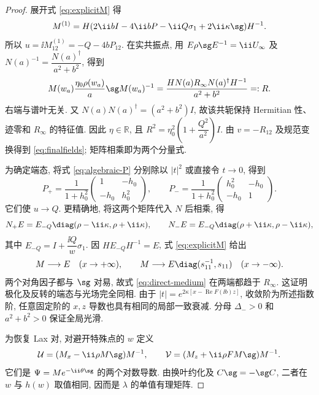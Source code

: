 \begin{proof}
展开式 \eqref{eq:explicitM} 得
\[
M^{(1)}=H(2\ii bI-4\ii bP-\ii Q\sigma_1+2\ii\kappa\sg)H^{-1}.
\]
所以 $u=\ii M^{(1)}_{12}=-Q-4bP_{12}$. 在实共振点, 用
$E\rho\sg E^{-1}=\ii U_\infty$ 及
$N(a)^{-1}=\dfrac{N(a)^\dagger}{a^2+b^2}$, 得到
\begin{equation}\label{eq:direct-medium}
M(w_a)\dfrac{\eta_0\rho(w_a)}{a}\sg M(w_a)^{-1}
=\dfrac{HN(a)R_\infty N(a)^\dagger H^{-1}}{a^2+b^2}=:R.
\end{equation}
右端与谱叶无关. 又 $N(a)N(a)^\dagger=(a^2+b^2)I$, 故该共轭保持 Hermitian 性、迹零和 $R_\infty$ 的特征值. 因此 $\eta\in\mathbb R$, 且 $R^2=\eta_0^2(1+\dfrac{Q^2}{a^2})I$. 由 $v=-R_{12}$ 及规范变换得到 \eqref{eq:finalfields}; 矩阵相乘即为两个分量式.

为确定端态, 将式 \eqref{eq:algebraic-P} 分别除以 $|t|^2$ 或直接令 $t\to0$, 得到
\begin{equation}\label{eq:Pends}
P_+=\dfrac{1}{1+h_0^2}\begin{pmatrix}1&-h_0\\-h_0&h_0^2\end{pmatrix},\qquad
P_-=\dfrac{1}{1+h_0^2}\begin{pmatrix}h_0^2&-h_0\\-h_0&1\end{pmatrix}.
\end{equation}
它们使 $u\to Q$. 更精确地, 将这两个矩阵代入 $N$ 后相乘, 得
\[
N_+E=E_{-Q}\diag(\rho-\ii\kappa,\rho+\ii\kappa),\qquad
N_-E=E_{-Q}\diag(\rho+\ii\kappa,\rho-\ii\kappa),
\]
其中 $E_{-Q}=I+\dfrac{\ii Q}{w}\sigma_1$. 因 $HE_{-Q}H^{-1}=E$, 式 \eqref{eq:explicitM} 给出
\begin{equation}\label{eq:direct-M-ends}
M\longrightarrow E\quad(x\to+\infty),\qquad
M\longrightarrow E\diag(s_{11}^{-1},s_{11})\quad(x\to-\infty).
\end{equation}
两个对角因子都与 $\sg$ 对易, 故式 \eqref{eq:direct-medium} 在两端都趋于 $R_\infty$. 这证明极化及反转的端态与光场完全同相. 由于 $|t|=e^{2\kappa[x-\operatorname{Re}F(\ii b)z]}$, 收敛阶为所述指数阶, 任意固定阶的 $x,z$ 导数也具有相同的局部一致衰减. 分母 $\Delta_->0$ 和 $a^2+b^2>0$ 保证全局光滑.

为恢复 Lax 对, 对避开特殊点的 $w$ 定义
\begin{equation}\label{eq:inverse-log-lax}
\mathcal U=(M_x-\ii\rho M\sg)M^{-1},\qquad
\mathcal V=(M_z+\ii\rho F M\sg)M^{-1}.
\end{equation}
它们是 $\Psi=M e^{-\ii\theta\sg}$ 的两个对数导数. 由换叶约化及 $C\sg=-\sg C$, 二者在 $w$ 与 $h(w)$ 取值相同, 因而是 $\lambda$ 的单值有理矩阵.


\end{proof}
